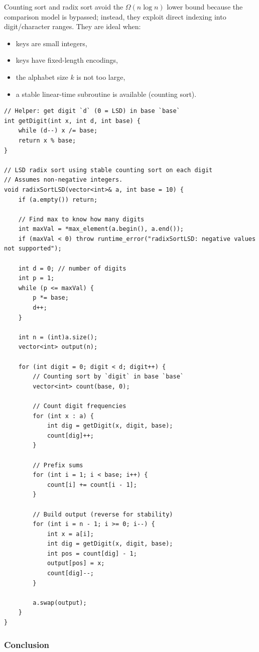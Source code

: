 \documentclass[9pt]{extarticle}
\begin{document}
Counting sort and radix sort avoid the $\Omega(n \log n)$ lower bound because
the comparison model is bypassed; instead, they exploit direct indexing into
digit/character ranges.  
They are ideal when:
\begin{itemize}
    \item keys are small integers,
    \item keys have fixed-length encodings,
    \item the alphabet size $k$ is not too large,
    \item a stable linear-time subroutine is available (counting sort).
\end{itemize}
\begin{lstlisting}
// Helper: get digit `d` (0 = LSD) in base `base`
int getDigit(int x, int d, int base) {
    while (d--) x /= base;
    return x % base;
}

// LSD radix sort using stable counting sort on each digit
// Assumes non-negative integers.
void radixSortLSD(vector<int>& a, int base = 10) {
    if (a.empty()) return;

    // Find max to know how many digits
    int maxVal = *max_element(a.begin(), a.end());
    if (maxVal < 0) throw runtime_error("radixSortLSD: negative values not supported");

    int d = 0; // number of digits
    int p = 1;
    while (p <= maxVal) {
        p *= base;
        d++;
    }

    int n = (int)a.size();
    vector<int> output(n);

    for (int digit = 0; digit < d; digit++) {
        // Counting sort by `digit` in base `base`
        vector<int> count(base, 0);

        // Count digit frequencies
        for (int x : a) {
            int dig = getDigit(x, digit, base);
            count[dig]++;
        }

        // Prefix sums
        for (int i = 1; i < base; i++) {
            count[i] += count[i - 1];
        }

        // Build output (reverse for stability)
        for (int i = n - 1; i >= 0; i--) {
            int x = a[i];
            int dig = getDigit(x, digit, base);
            int pos = count[dig] - 1;
            output[pos] = x;
            count[dig]--;
        }

        a.swap(output);
    }
}
\end{lstlisting}
\subsubsection*{Conclusion}
\end{document}
